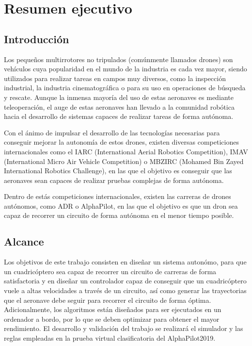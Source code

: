 \chapter*{Resumen ejecutivo}
\section*{Introducción}

Los pequeños multirrotores no tripulados (comúnmente llamados drones) son vehículos cuya popularidad en el mundo de la industria es cada vez mayor, siendo utilizados para realizar tareas en campos muy diversos, como la inspección industrial, la industria cinematográfica o para su uso en operaciones de búsqueda y rescate. Aunque la inmensa mayoría del uso de estas aeronaves es mediante teleoperación, el auge de estas aeronaves han llevado a la comunidad robótica hacia el desarrollo de sistemas capaces de realizar tareas de forma autónoma.

Con el ánimo de impulsar el desarrollo de las tecnologías necesarias para conseguir mejorar la autonomía de estos drones, existen diversas competiciones internacionales como el IARC (International Aerial Robotics Competition), IMAV (International Micro Air Vehicle Competition) o MBZIRC (Mohamed Bin Zayed International Robotics Challenge), en las que el objetivo es conseguir que las aeronaves sean capaces de realizar pruebas complejas de forma autónoma. 

Dentro de estás competiciones internacionales, existen las carreras de drones autónomos, como ADR o AlphaPilot, en las que el objetivo es que un dron sea capaz de recorrer un circuito de forma autónoma en el menor tiempo posible.

\section*{Alcance}
Los objetivos de este trabajo consisten en diseñar un sistema autonómo, para que un cuadricóptero sea capaz de recorrer un circuito de carreras de forma satisfactoria y en diseñar un controlador capaz de conseguir que un cuadricóptero vuele a altas velocidades a través de un circuito, así como generar las trayectorias que el aeronave debe seguir para recorrer el circuito de forma óptima. Adicionalmente, los algoritmos están diseñados para ser ejecutados en un ordenador a bordo, por lo que se deben optimizar para obtener el mayor rendimiento.
El desarrollo y validación del trabajo se realizará el simulador y las reglas empleadas en la prueba virtual clasificatoria del AlphaPilot2019.
